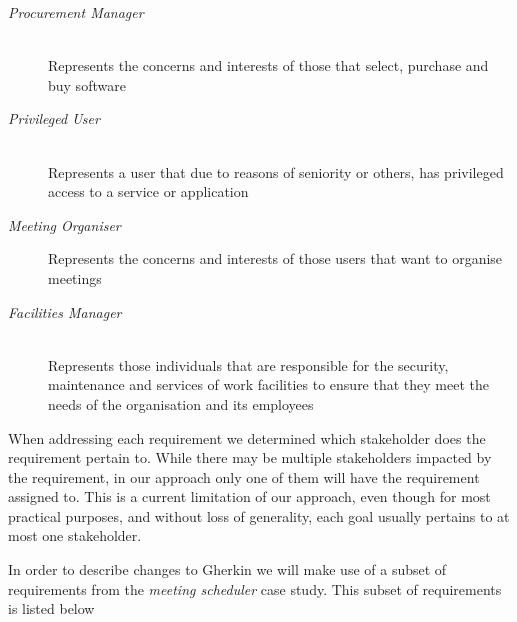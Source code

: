 \documentclass[dissertation,final]{softeng}
\begin{document}
\begin{description}
\item[\emph{Procurement Manager}] \hfill \\
Represents the concerns and interests of those that select, purchase and buy software
\item[\emph{Privileged User}] \hfill \\
Represents a user that due to reasons of seniority or others, has privileged access to a service or application
\item[\emph{Meeting Organiser}] \hfill
Represents the concerns and interests of those users that want to organise meetings
\item[\emph{Facilities Manager}] \hfill \\ 
Represents those individuals that are responsible for the security, maintenance and services of work facilities to ensure that they meet the needs of the organisation and its employees
\end{description}

When addressing each requirement we determined which stakeholder does the requirement pertain to. While there may be multiple stakeholders impacted by the requirement, in our approach only one of them will have the requirement assigned to. This is a current limitation of our approach, even though for most practical purposes, and without loss of generality, each goal usually pertains to at most one stakeholder.
 
In order to describe changes to Gherkin we will make use of a subset of requirements from the \emph{meeting scheduler} case study. This subset of requirements is listed below

\begin{table}[h!]
\caption[Exemplar subset of meeting scheduler requirements]{Exemplar subset of meeting scheduler requirements}
\label{tb:case_study_reqs_for_analysis}
\setlength{\extrarowheight}{1.8pt}
\centering
{}
\end{table}
\end{document}
